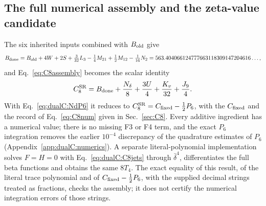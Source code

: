 \documentclass[11pt,a4paper]{article}
\numberwithin{equation}{section}
\newcommand{\CSR}{C^{\rm SR}}
\newcommand{\db}{\bar\delta}
\begin{document}
\subsection{The full numerical assembly and the zeta-value candidate}\label{app:dualC:C8assembly}
The six inherited inputs combined with $B_{\rm old}$ give
\begin{equation}
 B_{\rm done}=B_{\rm old}+4W+2S+\tfrac3{32}L_3-\tfrac14M_{21}+\tfrac12M_{12}-\tfrac1{16}N_2
 =563.404066124777663118309147204616\ldots,
\end{equation}
and Eq.~\eqref{eq:C8assembly} becomes the scalar identity
\begin{equation}
 \CSR_8=B_{\rm done}+\frac{N_\delta}{8}+\frac{3U}{4}+\frac{K_v}{32}+\frac{J_9}{4}.
\end{equation}
With Eq.~\eqref{eq:dualC:NdP6} it reduces to $\CSR_8=C_{\rm fixed}-\frac12P_6$, with the $C_{\rm fixed}$ and the
record of Eq.~\eqref{eq:C8num} given in Sec.~\ref{sec:C8}. Every additive ingredient has a numerical value; there is
no missing F3 or F4 term, and the exact $P_6$ integration removes the earlier $10^{-4}$ discrepancy of the
quadrature estimates of $P_6$ (Appendix~\ref{app:dualC:numerics}). A separate literal-polynomial implementation solves
$F=H=0$ with Eq.~\eqref{eq:dualC:C8jets} through $\db^4$, differentiates the full beta functions and obtains the same
$8T_4$. The exact equality of this result, of the literal trace polynomial and of $C_{\rm fixed}-\frac12P_6$, with the
supplied decimal strings treated as fractions, checks the assembly; it does not certify the numerical integration
errors of those strings.
\end{document}

